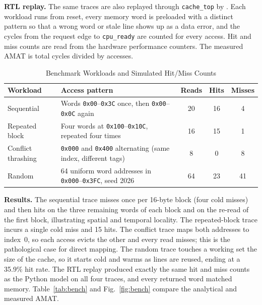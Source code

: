 \documentclass[conference,a4paper]{IEEEtran}
\begin{document}
\textbf{RTL replay.} The same traces are also replayed through \texttt{cache\_top} by . Each workload runs from reset, every memory word is preloaded with a distinct pattern so that a wrong word or stale line shows up as a data error, and the cycles from the request edge to \texttt{cpu\_ready} are counted for every access. Hit and miss counts are read from the hardware performance counters. The measured AMAT is total cycles divided by accesses.

\begin{table}[!t]
\caption{Benchmark Workloads and Simulated Hit/Miss Counts}\label{tab:traces}
\centering
\renewcommand{\arraystretch}{1.05}
\footnotesize
\begin{tabular}{@{}lp{3.0cm}ccc@{}}
\toprule
\textbf{Workload} & \textbf{Access pattern} & \textbf{Reads} & \textbf{Hits} & \textbf{Misses}\\
\midrule
Sequential & Words \texttt{0x00}--\texttt{0x3C} once, then \texttt{0x00}--\texttt{0x0C} again & 20 & 16 & 4\\
Repeated block & Four words at \texttt{0x100}--\texttt{0x10C}, repeated four times & 16 & 15 & 1\\
Conflict thrashing & \texttt{0x000} and \texttt{0x400} alternating (same index, different tags) & 8 & 0 & 8\\
Random & 64 uniform word addresses in \texttt{0x000}--\texttt{0x3FC}, seed 2026 & 64 & 23 & 41\\
\bottomrule
\end{tabular}
\end{table}

\textbf{Results.} The sequential trace misses once per 16-byte block (four cold misses) and then hits on the three remaining words of each block and on the re-read of the first block, illustrating spatial and temporal locality. The repeated-block trace incurs a single cold miss and 15 hits. The conflict trace maps both addresses to index~0, so each access evicts the other and every read misses; this is the pathological case for direct mapping. The random trace touches a working set the size of the cache, so it starts cold and warms as lines are reused, ending at a 35.9\% hit rate. The RTL replay produced exactly the same hit and miss counts as the Python model on all four traces, and every returned word matched memory. Table~\ref{tab:bench} and Fig.~\ref{fig:bench} compare the analytical and measured AMAT.
\end{document}

